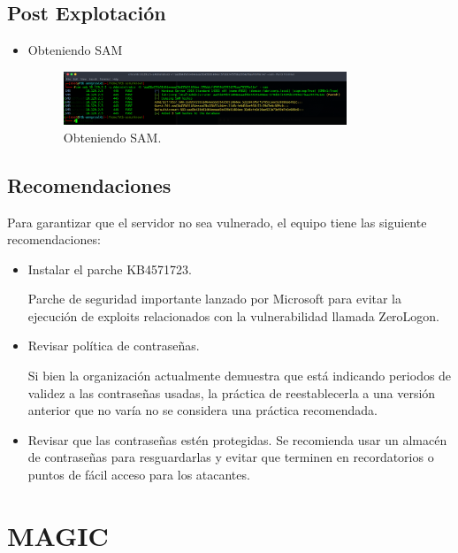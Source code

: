 \documentclass{article}
\begin{document}
\subsection{Post Explotación}
\begin{itemize}
	\item Obteniendo SAM
	\begin{figure}[h]
		\center
		\includegraphics[width=0.8\textwidth]{images/fuse/sam.png}
		\caption{Obteniendo SAM.}

	\end{figure}
\end{itemize}

\subsection{Recomendaciones}
Para garantizar que el servidor no sea vulnerado, el equipo tiene las siguiente recomendaciones:
\begin{itemize}
	\item Instalar el parche KB4571723.
	
	Parche de seguridad importante lanzado por Microsoft para evitar la ejecución de exploits relacionados con la vulnerabilidad llamada ZeroLogon.
	\item Revisar política de contraseñas.
	
	Si bien la organización actualmente demuestra que está indicando periodos de validez a las contraseñas usadas, la práctica de reestablecerla a una versión anterior que no varía no se considera una práctica recomendada.

	\item Revisar que las contraseñas estén protegidas.
	Se recomienda usar un almacén de contraseñas para resguardarlas y evitar que terminen en recordatorios o puntos de fácil acceso para los atacantes.
\end{itemize}

\clearpage 

\section{MAGIC}
\end{document}
